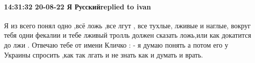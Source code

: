  
 
 
 
 

\paragraph{14:31:32 20-08-22 Я Русскийreplied to ivan}

Я из всего понял одно ,всё ложь ,все лгут , все тухлые, лживые и наглые, вокруг
тебя одни фекалии и тебе лживый тролль должен сказать ложь,или как докатится до
лжи . Отвечаю тебе от имени Кличко : - я думаю понять а потом его у Украины
спросить ,как так лгать и не знать как и думать и врать.
